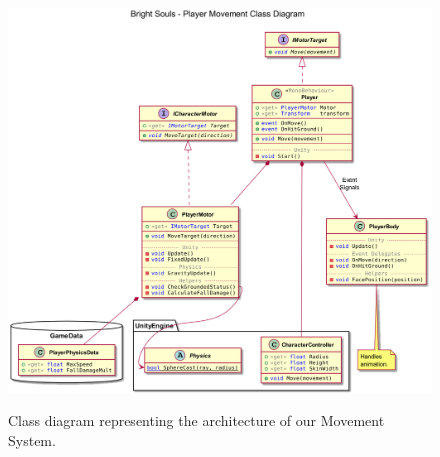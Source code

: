 \begin{figure}[!ht]
    \begin{center}
    \caption{Class diagram representing the architecture of our Movement System.}
    \vspace{0.5em}
        \includegraphics[width=34em]{figures/fig-player-movement-class-diagram.png}
        \label{fig:movement-class-diagram}
    \end{center}
\end{figure}